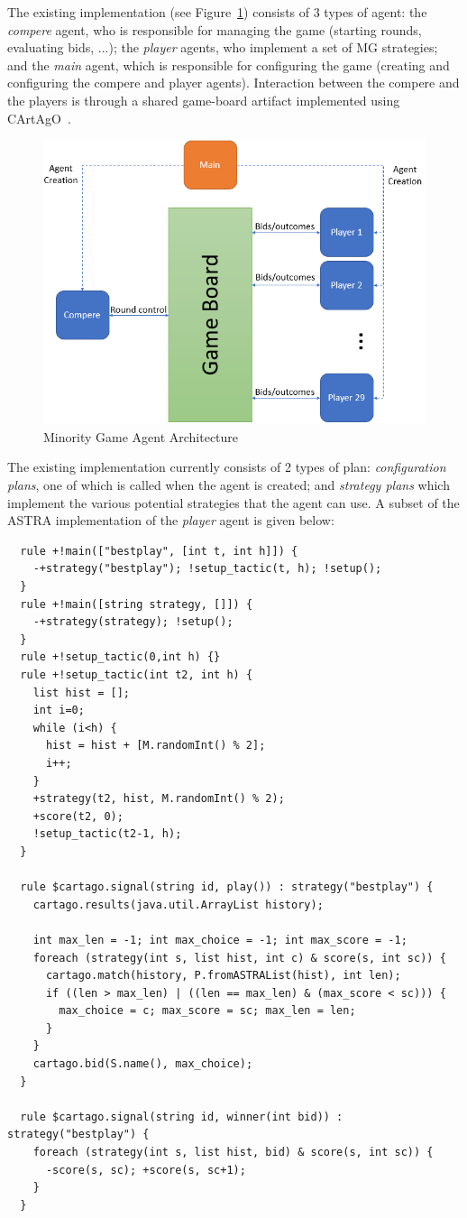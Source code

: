 The existing implementation (see Figure~\ref{fig:mgagents}) consists of 3 types of agent: the 
\emph{compere} agent, who is responsible for managing the game (starting rounds, evaluating bids,
 ...); the \emph{player} agents, who implement a set of MG strategies; and the \emph{main} agent, 
 which is responsible for configuring the game (creating and configuring the compere and player 
 agents). Interaction between the compere and the players is through a shared game-board artifact 
 implemented using CArtAgO~\cite{RicciEPC}.

\begin{figure}[!tbh]
\centering
\includegraphics[width=.7\linewidth]{mg.png}
\caption{Minority Game Agent Architecture}
\label{fig:mgagents}
\end{figure}

The existing implementation currently consists of 2 types of plan: \emph{configuration plans}, one of which is
called when the agent is created; and \emph{strategy plans} which implement the various potential strategies
that the agent can use. A subset of the ASTRA implementation of the \emph{player} agent is given below:

{\footnotesize
\begin{verbatim}
  rule +!main(["bestplay", [int t, int h]]) {
    -+strategy("bestplay"); !setup_tactic(t, h); !setup();
  }
  rule +!main([string strategy, []]) { 
    -+strategy(strategy); !setup();
  }
  rule +!setup_tactic(0,int h) {}
  rule +!setup_tactic(int t2, int h) {
    list hist = [];
    int i=0;
    while (i<h) {
      hist = hist + [M.randomInt() % 2];
      i++;
    }
    +strategy(t2, hist, M.randomInt() % 2);
    +score(t2, 0);
    !setup_tactic(t2-1, h);
  }
		
  rule $cartago.signal(string id, play()) : strategy("bestplay") {
    cartago.results(java.util.ArrayList history);
		
    int max_len = -1; int max_choice = -1; int max_score = -1;
    foreach (strategy(int s, list hist, int c) & score(s, int sc)) {
      cartago.match(history, P.fromASTRAList(hist), int len);
      if ((len > max_len) | ((len == max_len) & (max_score < sc))) {
        max_choice = c;	max_score = sc; max_len = len;
      }
    }
    cartago.bid(S.name(), max_choice);
  }
		
  rule $cartago.signal(string id, winner(int bid)) : strategy("bestplay") {
    foreach (strategy(int s, list hist, bid) & score(s, int sc)) {
      -score(s, sc); +score(s, sc+1);
    }
  }
\end{verbatim}}

